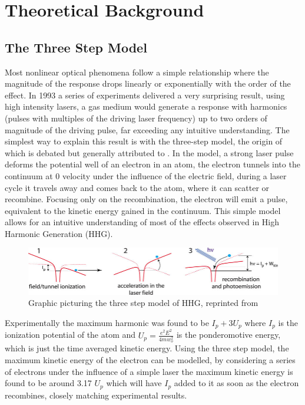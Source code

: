 \documentclass[11pt,a4paper]{report}
\begin{document}
\thispagestyle{fancy}
\setlength{\footskip}{0pt}
\chapter{Theoretical Background}
\vspace{-10mm}
\section{The Three Step Model}
Most nonlinear optical phenomena follow a simple relationship where the magnitude of the response drops linearly or exponentially with the order of the effect. In 1993 a series of experiments \cite{firstatto1}\cite{firstatto2} delivered a very surprising result, using high intensity lasers, a gas medium would generate a response with harmonics (pulses with multiples of the driving laser frequency) up to two orders of magnitude of the driving pulse, far exceeding any intuitive understanding. The simplest way to explain this result is with the three-step model, the origin of which is debated but generally attributed to \cite{threestep1}\cite{threestep2}\cite{threestep3}. In the model, a strong laser pulse deforms the potential well of an electron in an atom, the electron tunnels into the continuum at 0 velocity under the influence of the electric field, during a laser cycle it travels away and comes back to the atom, where it can scatter or recombine. Focusing only on the recombination, the electron will emit a pulse, equivalent to the kinetic energy gained in the continuum. This simple model allows for an intuitive understanding of most of the effects observed in High Harmonic Generation (HHG).
\\
\begin{figure}[h]

\includegraphics[width=1\textwidth]{threestep.jpg}
\caption{Graphic picturing the three step model of HHG, reprinted from \cite{Threestepfig}}
\end{figure}

Experimentally the maximum harmonic was found to be $I_p + 3U_p$ where $I_p$ is the ionization potential of the atom and $U_p = \frac{e^2 E^2}{4mw^{2}_o}$ is the ponderomotive energy, which is just the time averaged kinetic energy. Using the three step model, the maximum kinetic energy of the electron can be modelled, by considering a series of electrons under the influence of a simple laser the maximum kinetic energy is found to be around 3.17 $U_p$ which will have $I_p$ added to it as soon as the electron recombines, closely matching experimental results.
\end{document}
